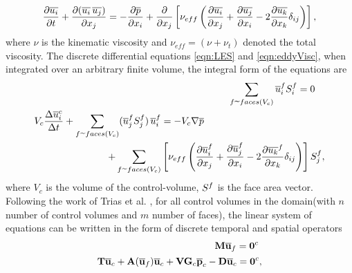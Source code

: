 \begin{equation}
\begin{split}
\frac{\partial {\overline{u_i}}}{\partial t} + \frac{\partial (\overline{u_i} \, \overline{u_j}) }{\partial x_{j}}
 = 
 -\frac{\partial \overline{p}}{\partial x_{i}} 
 + \frac{\partial}{\partial x_j} \left[ \nu_{eff} 
 \left( 
 \frac{\partial \overline{u_i}}{\partial x_{j}} 
 + \frac{\partial \overline{u_j}}{\partial x_{i}} 
 - 2 \frac{\partial \overline{u_k}}{\partial x_{k}} \delta_{ij} 
 \right) 
 \right], 
\end{split} 
\label{eqn:eddyVisc}
\end{equation}
where $\nu$ is the kinematic viscosity and $\nu_{eff} = (\nu + \nu_t) $ denoted the total viscosity. The discrete differential equations \eqref{eqn:LES} and \eqref{eqn:eddyVisc}, when integrated over an arbitrary finite volume, the integral form of the equations are
\begin{subequations}
\begin{align}
\begin{split}
\sumFV {\av{u}_i^f} \areaVec{i} & = 0
\end{split} \\
\begin{split}
V_{c} \Ddt {\av{u}_i^c} 
+ \sumFV ({\av{u}_j^f} \areaVec{j}) \, {\av{u}_i^f} 
& = 
- V_{c} \nabla \overline{p}
\\
+ \sumFV &\left[ 
 \nu_{eff} \left(
 \ddx {\av{u}_i^f}{j} 
 + \ddx {\av{u}_j^f}{i} 
 - 2 \ddx {\av{u_k}^f}{k} \delta_{ij} 
 \right) 
 \right] \areaVec{j},
\end{split}
\end{align}
\label{eqn:LES-FVM}
\end{subequations}
where $V_{c}$ is the volume of the control-volume, ${S}_{}^f$ is the face area vector. Following the work of Trias et al. \cite{trias2014}, for all control volumes in the domain(with $n$ number of control volumes and $m$ number of faces), the linear system of equations can be written in the form of discrete temporal and spatial operators
\begin{subequations}
\begin{align}
\begin{split}
\mathbf{M} \overline{\mathbf{u}}_f = \mathbf{0}^c\
\label{eqn:massCons}
\end{split}
\\
\begin{split}
\mathbf{T}\overline{\mathbf{u}}_c 
+ \mathbf{A}( \overline{\mathbf{u}}_f ) {\overline{\mathbf{u}}_c} 
+ \mathbf{V} \mathbf{G}_c \overline{\mathbf{p}}_c
- \mathbf{D} {\overline{\mathbf{u}}_c} = \mathbf{0}^c,
\label{eqn:momentumCons}
\end{split}
\end{align}
\label{eqn:discreteOperators}
\end{subequations}
